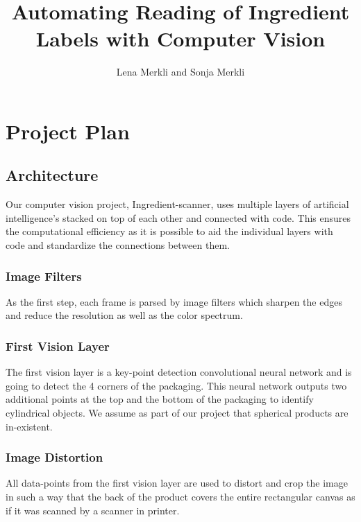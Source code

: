 \documentclass[a4paper,11pt]{report}
\title{Automating Reading of Ingredient Labels with Computer Vision}
\author{Lena Merkli and Sonja Merkli}
\begin{document}
    \maketitle
    \tableofcontents

    \chapter{Project Plan}

        \section{Architecture}
                Our computer vision project, Ingredient-scanner, uses multiple layers of artificial intelligence's stacked on top of each other and connected with code. This ensures the computational efficiency as it is possible to aid the individual layers with code and standardize the connections between them.

            \subsection{Image Filters}
                \label{subsec:architecture:filters}
                As the first step, each frame is parsed by image filters which sharpen the edges and reduce the resolution as well as the color spectrum.

            \subsection{First Vision Layer}
                The first vision layer is a key-point detection convolutional neural network and is going to detect the 4 corners of the packaging. This neural network outputs two additional points at the top and the bottom of the packaging to identify cylindrical objects. We assume as part of our project that spherical products are in-existent.

            \subsection{Image Distortion}
                \label{subsec:architecture:distortion}
                All data-points from the first vision layer are used to distort and crop the image in such a way that the back of the product covers the entire rectangular canvas as if it was scanned by a scanner in printer.
\end{document}
